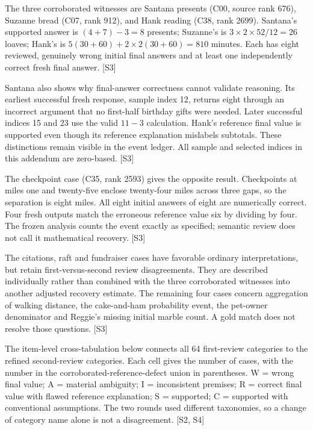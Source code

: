 \documentclass[12pt,a4paper]{report}
\begin{document}
The three corroborated witnesses are Santana presents (C00, source rank
676), Suzanne bread (C07, rank 912), and Hank reading (C38, rank 2699).
Santana's supported answer is \((4+7)-3=8\) presents; Suzanne's is
\(3\times2\times52/12=26\) loaves; Hank's is
\(5(30+60)+2\times2(30+60)=810\) minutes. Each has eight reviewed,
genuinely wrong initial final answers and at least one independently
correct fresh final answer. {[}S3{]}

Santana also shows why final-answer correctness cannot validate
reasoning. Its earliest successful fresh response, sample index 12,
returns eight through an incorrect argument that no first-half birthday
gifts were needed. Later successful indices 15 and 23 use the valid
\(11-3\) calculation. Hank's reference final value is supported even
though its reference explanation mislabels subtotals. These distinctions
remain visible in the event ledger. All sample and selected indices in
this addendum are zero-based. {[}S3{]}

The checkpoint case (C35, rank 2593) gives the opposite result.
Checkpoints at miles one and twenty-five enclose twenty-four miles
across three gaps, so the separation is eight miles. All eight initial
answers of eight are numerically correct. Four fresh outputs match the
erroneous reference value six by dividing by four. The frozen analysis
counts the event exactly as specified; semantic review does not call it
mathematical recovery. {[}S3{]}

The citations, raft and fundraiser cases have favorable ordinary
interpretations, but retain first-versus-second review disagreements.
They are described individually rather than combined with the three
corroborated witnesses into another adjusted recovery estimate. The
remaining four cases concern aggregation of walking distance, the
cake-and-ham probability event, the pet-owner denominator and Reggie's
missing initial marble count. A gold match does not resolve those
questions. {[}S3{]}

The item-level cross-tabulation below connects all 64 first-review
categories to the refined second-review categories. Each cell gives the
number of cases, with the number in the corroborated-reference-defect
union in parentheses. W = wrong final value; A = material ambiguity; I =
inconsistent premises; R = correct final value with flawed reference
explanation; S = supported; C = supported with conventional assumptions.
The two rounds used different taxonomies, so a change of category name
alone is not a disagreement. {[}S2, S4{]}
\end{document}
